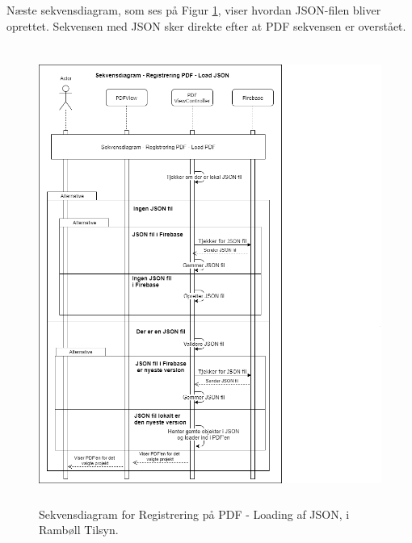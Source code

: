 Næste sekvensdiagram, som ses på Figur \ref{fig:LoadJSONSekvensDiagram}, viser hvordan JSON-filen bliver oprettet. Sekvensen med JSON sker direkte efter at PDF sekvensen er overstået.
\begin{figure}[H] %
	\centering
	\includegraphics[height=15cm, width=15cm]{../ArkitekturDesign/Design/RegisterPDF/LoadJSONSekvensDiagram}
	\caption{Sekvensdiagram for Registrering på PDF - Loading af JSON, i Rambøll Tilsyn.}
	\label{fig:LoadJSONSekvensDiagram}
\end{figure}

\clearpage

